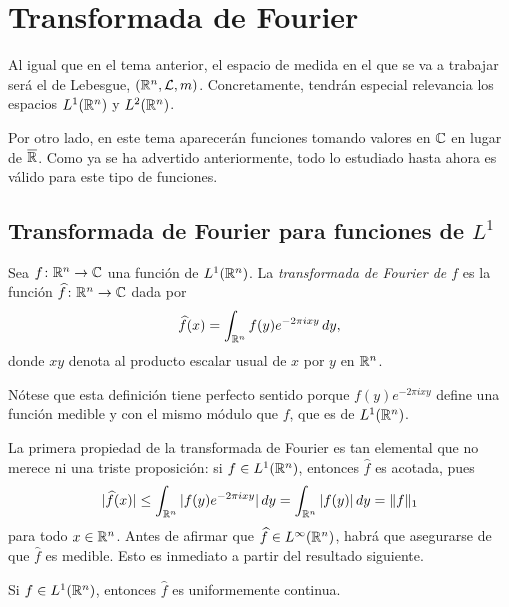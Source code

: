 \documentclass[a4paper, 11pt, oneside]{report}
\begin{document}
\chapter{Transformada de Fourier}

Al igual que en el tema anterior, el espacio de medida en el que se va a trabajar será el de Lebesgue, $(\mathbb R^n, \mathcal{L},m)$. Concretamente, tendrán especial relevancia los espacios $L^1(\mathbb R^n)$ y $L^2(\mathbb R^n)$.

Por otro lado, en este tema aparecerán funciones tomando valores en $\mathbb C$ en lugar de $\overline{\mathbb R}$. Como ya se ha advertido anteriormente, todo lo estudiado hasta ahora es válido para este tipo de funciones.

\section[Transformada de Fourier para funciones de \texorpdfstring{$L^1$}{L1}]{Transformada de Fourier para funciones de \texorpdfstring{\boldmath$L^1$}{L1}}

\begin{definition}
  Sea $f \colon \mathbb R^n \to \mathbb C$ una función de $L^1(\mathbb R^n)$. La \emph{transformada de Fourier de $f$} es la función $\widehat{f} \colon \mathbb R^n \to \mathbb C$ dada por
  \[\widehat{f}(x)=\int_{\mathbb R^n} f(y) e^{-2\pi ix y}\, dy,\]
  donde $xy$ denota al producto escalar usual de $x$ por $y$ en $\mathbb R^n$.
\end{definition}

Nótese que esta definición tiene perfecto sentido porque $f(y)e^{-2\pi i xy}$ define una función medible y con el mismo módulo que $f$, que es de $L^1(\mathbb R^n)$.

La primera propiedad de la transformada de Fourier es tan elemental que no merece ni una triste proposición: si $f \in L^1(\mathbb R^n)$, entonces $\widehat{f}$ es acotada, pues
\[|\widehat{f}(x)| \leq \int_{\mathbb R^n} |f(y)e^{-2\pi i xy}| \, dy = \int_{\mathbb R^n} |f(y)| \, dy = \|f\|_1\]
para todo $x \in \mathbb R^n$. Antes de afirmar que $\widehat{f} \in L^\infty(\mathbb R^n)$, habrá que asegurarse de que $\widehat{f}$ es medible. Esto es inmediato a partir del resultado siguiente.

\begin{theorem}
  Si $f \in L^1(\mathbb R^n)$, entonces $\widehat{f}$ es uniformemente continua.
\end{theorem}
\end{document}
